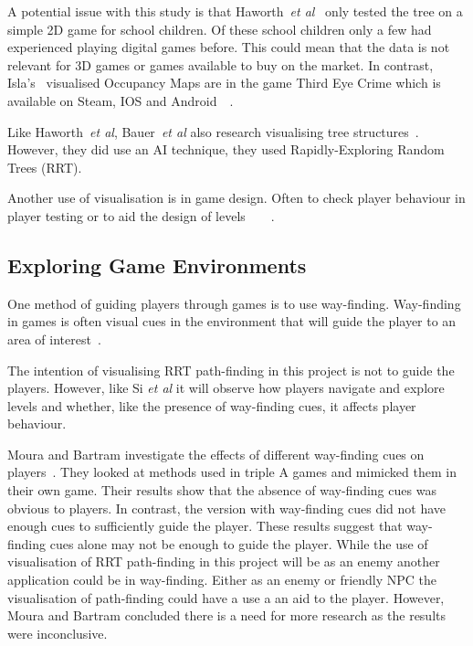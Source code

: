 \documentclass[journal]{IEEEtran}
\begin{document}
A potential issue with this study is that Haworth~\textit{et al}~\cite{Haworth2010} only tested the tree on a simple 2D game for school children. Of these school children only a few had experienced playing digital games before.  This could mean that the data is not relevant for 3D games or games available to buy on the market.  In contrast, Isla's~\cite{Isla2014} visualised Occupancy Maps are in the game Third Eye Crime which is available on Steam, IOS and Android~\cite{Isla2014}~\cite{game:ThirdEyeCrime}.

Like  Haworth~\textit{et al}, Bauer~\textit{et al} also research visualising tree structures~\cite{bauer2012}. However, they did use an AI technique, they used Rapidly-Exploring Random Trees (RRT).

Another use of visualisation is in game design. Often to check player behaviour in player testing or to aid the design of levels~\cite{Nelson2011}~\cite{bauer2012}~\cite{Tremblay2013}~\cite{Tremblay2014}. 

\subsection{Exploring Game Environments}
One method of guiding players through games is to use way-finding. Way-finding in games is often visual cues in the environment that will guide the player to an area of interest~\cite{si2017, Bacim2008}. 

The intention of visualising RRT path-finding in this project is not to guide the players. However, like Si \textit{et al}  it will observe how players navigate and explore levels and whether, like the presence of way-finding cues, it affects player behaviour. 

Moura and Bartram investigate the effects of different way-finding cues on players~\cite{moura2014}.  They looked at methods used in triple A games and mimicked them in their own game. Their results show that the absence of way-finding cues was obvious to players. In contrast, the version with way-finding cues did not have enough cues to sufficiently guide the player. These results suggest that way-finding cues alone may not be enough to guide the player. While the use of visualisation of RRT path-finding in this project will be as an enemy another application could be in way-finding. Either as an enemy or friendly NPC the visualisation of path-finding could have a use a an aid to the player. However, Moura and Bartram concluded there is a need for more research as the results were inconclusive. 
 
\end{document}
